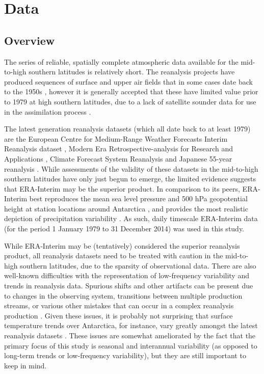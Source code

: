 \section{Data}\label{s:data}

\subsection{Overview}

The series of reliable, spatially complete atmospheric data available for the mid-to-high southern latitudes is relatively short. The reanalysis projects have produced sequences of surface and upper air fields that in some cases date back to the 1950s \citep{Kistler2001,Uppala2005,Kobayashi2015}, however it is generally accepted that these have limited value prior to 1979 at high southern latitudes, due to a lack of satellite sounder data for use in the assimilation process \citep{Hines2000}.

The latest generation reanalysis datasets (which all date back to at least 1979) are the European Centre for Medium-Range Weather Forecasts Interim Reanalysis dataset \citep[ERA-Interim;][]{Dee2011}, Modern Era Retrospective-analysis for Research and Applications \citep[Merra;][]{Rienecker2011}, Climate Forecast System Reanalysis \citep[CFSR;][]{Saha2010} and Japanese 55-year reanalysis \citep[JRA-55;][]{Kobayashi2015}. While assessments of the validity of these datasets in the mid-to-high southern latitudes have only just begun to emerge, the limited evidence suggests that ERA-Interim may be the superior product. In comparison to its peers, ERA-Interim best reproduces the mean sea level pressure and 500 hPa geopotential height at station locations around Antarctica \citep{Bracegirdle2012}, and provides the most realistic depiction of precipitation variability \citep{Bromwich2011,Nicolas2011}. As such, daily timescale ERA-Interim data (for the period 1 January 1979 to 31 December 2014) was used in this study.

While ERA-Interim may be (tentatively) considered the superior reanalysis product, all reanalysis datasets need to be treated with caution in the mid-to-high southern latitudes, due to the sparsity of observational data. There are also well-known difficulties with the representation of low-frequency variability and trends in reanalysis data. Spurious shifts and other artifacts can be present due to changes in the observing system, transitions between multiple production streams, or various other mistakes that can occur in a complex reanalysis production \citep{Dee2014}. Given these issues, it is probably not surprising that surface temperature trends over Antarctica, for instance, vary greatly amongst the latest reanalysis datasets \citep{Nicolas2014}. These issues are somewhat ameliorated by the fact that the primary focus of this study is seasonal and interannual variability (as opposed to long-term trends or low-frequency variability), but they are still important to keep in mind.

